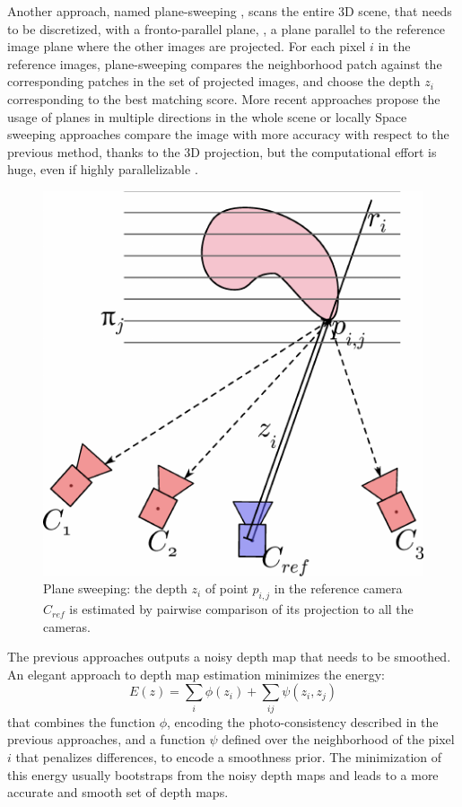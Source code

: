 Another approach, named plane-sweeping \cite{collins1996space}, scans the entire 3D scene, that needs to be discretized, with a fronto-parallel plane, \ie, a plane parallel to the reference image plane where the other images are projected. 
For each pixel $i$ in the reference images, plane-sweeping compares the neighborhood patch against the corresponding patches in the set of projected images, and choose the depth $z_i$ corresponding to the best matching score. 
More recent approaches propose the usage of planes in multiple directions in the whole scene \cite{gallup2007real} or locally \cite{sinha2014efficient}
Space sweeping approaches compare the image with more accuracy with respect to the previous method, thanks to the 3D projection, but the computational effort is huge, even if highly parallelizable \cite{yang2003multi}.




\begin{figure}[t]
\centering
  \includegraphics[width=0.7\columnwidth]{./img/ch_soa/planesweeping}
 \caption{Plane sweeping: the depth $z_i$ of point $p_{i,j}$ in the reference camera $C_{ref}$ is estimated by pairwise comparison of its projection to all the cameras.}
 \label{fig:planesweeping}
\end{figure}




The previous approaches outputs a noisy depth map that needs to be smoothed. 
An elegant approach to depth map estimation  minimizes the energy:
\begin{equation}
 \label{eq:depthenergy} 
 E(z) = \sum_i \phi(z_i)  + \sum_{ij} \psi(z_i,z_j)
\end{equation}
that combines the function $\phi$, encoding the photo-consistency described in the previous approaches, and a function $\psi$ defined over the neighborhood of the pixel $i$ that penalizes differences, to encode a smoothness prior. 
The minimization of this energy usually bootstraps from the noisy depth maps and leads to a more accurate and smooth set of depth maps.

